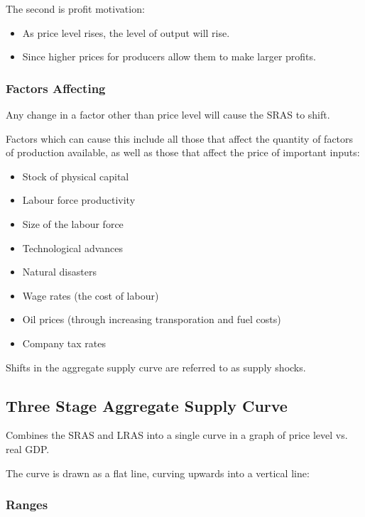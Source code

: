 \documentclass[a4paper,11pt]{article}
\begin{document}
The second is profit motivation:

\begin{itemize}
\item As price level rises, the level of output will rise.
\item Since higher prices for producers allow them to make larger profits.
\end{itemize}


\subsubsection{Factors Affecting}

Any change in a factor other than price level will cause the SRAS to shift.

Factors which can cause this include all those that affect the quantity of
factors of production available, as well as those that affect the price of
important inputs:

\begin{itemize}
\item Stock of physical capital
\item Labour force productivity
\item Size of the labour force
\item Technological advances
\item Natural disasters
\item Wage rates (the cost of labour)
\item Oil prices (through increasing transporation and fuel costs)
\item Company tax rates
\end{itemize}

Shifts in the aggregate supply curve are referred to as supply shocks.


\subsection{Three Stage Aggregate Supply Curve}

Combines the SRAS and LRAS into a single curve in a graph of price level vs.
real GDP.

The curve is drawn as a flat line, curving upwards into a vertical line:



\subsubsection{Ranges}
\end{document}
